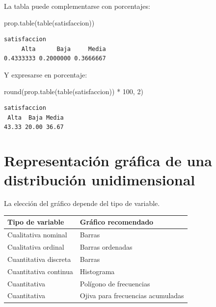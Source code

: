 \documentclass[
  spanish,
  14pt,
  letterpaper,
  DIV=11,
  numbers=noendperiod]{scrartcl}
\newenvironment{Shaded}{\begin{snugshade}}{\end{snugshade}}
\newcommand{\DecValTok}[1]{\textcolor[rgb]{0.68,0.51,1.00}{#1}}
\newcommand{\FunctionTok}[1]{\textcolor[rgb]{0.65,0.89,0.18}{#1}}
\newcommand{\NormalTok}[1]{\textcolor[rgb]{0.97,0.97,0.95}{#1}}
\newcommand{\SpecialCharTok}[1]{\textcolor[rgb]{0.68,0.51,1.00}{#1}}
\newcounter{none} %
\begin{document}
La tabla puede complementarse con porcentajes:

\begin{Shaded}
\begin{Highlighting}[]
\FunctionTok{prop.table}\NormalTok{(}\FunctionTok{table}\NormalTok{(satisfaccion))}
\end{Highlighting}
\end{Shaded}

\begin{verbatim}
satisfaccion
     Alta      Baja     Media 
0.4333333 0.2000000 0.3666667 
\end{verbatim}

Y expresarse en porcentaje:

\begin{Shaded}
\begin{Highlighting}[]
\FunctionTok{round}\NormalTok{(}\FunctionTok{prop.table}\NormalTok{(}\FunctionTok{table}\NormalTok{(satisfaccion)) }\SpecialCharTok{*} \DecValTok{100}\NormalTok{, }\DecValTok{2}\NormalTok{)}
\end{Highlighting}
\end{Shaded}

\begin{verbatim}
satisfaccion
 Alta  Baja Media 
43.33 20.00 36.67 
\end{verbatim}

\section{Representación gráfica de una distribución
unidimensional}\label{representaciuxf3n-gruxe1fica-de-una-distribuciuxf3n-unidimensional}

La elección del gráfico depende del tipo de variable.

{\def\LTcaptype{none} %
\begin{longtable}[]{@{}ll@{}}
\toprule\noalign{}
Tipo de variable & Gráfico recomendado \\
\midrule\noalign{}
\endhead
\bottomrule\noalign{}
\endlastfoot
Cualitativa nominal & Barras \\
Cualitativa ordinal & Barras ordenadas \\
Cuantitativa discreta & Barras \\
Cuantitativa continua & Histograma \\
Cuantitativa & Polígono de frecuencias \\
Cuantitativa & Ojiva para frecuencias acumuladas \\
\end{longtable}
}
\end{document}
